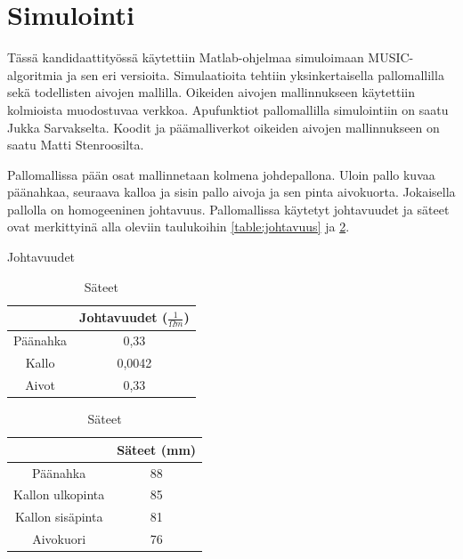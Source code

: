 \section{Simulointi}
Tässä kandidaattityössä käytettiin Matlab-ohjelmaa simuloimaan MUSIC-algoritmia ja sen eri versioita. Simulaatioita tehtiin yksinkertaisella pallomallilla sekä todellisten aivojen mallilla. Oikeiden aivojen mallinnukseen käytettiin kolmioista muodostuvaa verkkoa. Apufunktiot pallomallilla simulointiin on saatu Jukka Sarvakselta. Koodit ja päämalliverkot oikeiden aivojen mallinnukseen on saatu Matti Stenroosilta.

Pallomallissa pään osat mallinnetaan kolmena johdepallona. Uloin pallo kuvaa päänahkaa, seuraava kalloa ja sisin pallo aivoja ja sen pinta aivokuorta. Jokaisella pallolla on homogeeninen johtavuus. Pallomallissa käytetyt johtavuudet ja säteet ovat merkittyinä alla oleviin taulukoihin \ref{table:johtavuus} ja \ref{table:sateet}.

\begin{table}[h]
\begin{minipage}{0.5\textwidth}
    \caption{Johtavuudet}
    \begin{center}
        \begin{tabular}{|c|c|}
            \hline
            & Johtavuudet ($\frac{1}{\Omega m}$)\\ \hline
            Päänahka & 0,33 \\
            Kallo & 0,0042 \\
            Aivot & 0,33 \\
            \hline
        
        \end{tabular}
    \end{center}
    \label{table:johtavuus}
\end{minipage}
\begin{minipage}{0.5\textwidth}
    \caption{Säteet}
    \begin{center}
        \begin{tabular}{|c|c|}
            \hline
            & Säteet (mm)\\ \hline
            Päänahka & 88 \\
            Kallon ulkopinta & 85 \\
            Kallon sisäpinta & 81 \\
            Aivokuori & 76 \\
            \hline
        \end{tabular}
    \end{center}
    \label{table:sateet}
\end{minipage}
\end{table}

